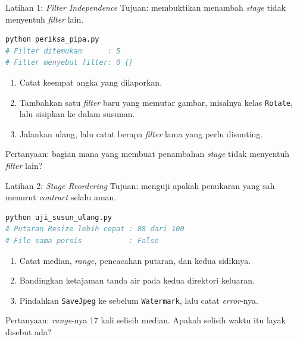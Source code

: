 \documentclass[aspectratio=169, table, 12pt]{beamer}
\begin{document}
\begin{frame}[fragile]{{\Large Latihan 1: \textit{Filter Independence}}}
  \vspace{2pt}
  {\small Tujuan: membuktikan menambah \textit{stage} tidak menyentuh
  \textit{filter} lain.}

  \vspace{2pt}
\begin{lstlisting}[language=bash]
python periksa_pipa.py
# Filter ditemukan      : 5
# Filter menyebut filter: 0 {}
\end{lstlisting}

  \vspace{3pt}
  \begin{enumerate}\small
    \item Catat keempat angka yang dilaporkan.
    \item Tambahkan satu \textit{filter} baru yang memutar gambar, misalnya
          kelas \texttt{Rotate}, lalu sisipkan ke dalam susunan.
    \item Jalankan ulang, lalu catat berapa \textit{filter} lama yang perlu
          disunting.
  \end{enumerate}

  \vspace{3pt}
  {\small Pertanyaan: bagian mana yang membuat penambahan \textit{stage} tidak
  menyentuh \textit{filter} lain?}
\end{frame}

\begin{frame}[fragile]{{\Large Latihan 2: \textit{Stage Reordering}}}
  \vspace{2pt}
  {\small Tujuan: menguji apakah penukaran yang sah menurut \textit{contract}
  selalu aman.}

  \vspace{2pt}
\begin{lstlisting}[language=bash]
python uji_susun_ulang.py
# Putaran Resize lebih cepat : 88 dari 100
# File sama persis           : False
\end{lstlisting}

  \vspace{3pt}
  \begin{enumerate}\small
    \item Catat median, \textit{range}, pencacahan putaran, dan kedua sidiknya.
    \item Bandingkan ketajaman tanda air pada kedua direktori keluaran.
    \item Pindahkan \texttt{SaveJpeg} ke sebelum \texttt{Watermark}, lalu catat
          \textit{error}-nya.
  \end{enumerate}

  \vspace{3pt}
  {\small Pertanyaan: \textit{range}-nya 17 kali selisih median. Apakah
  selisih waktu itu layak disebut ada?}
\end{frame}
\end{document}
